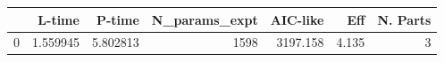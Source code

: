 \begin{tabular}{lrrrrrr}
\toprule
{} &    L-time &    P-time &  N\_params\_expt &  AIC-like &    Eff &  N. Parts \\
\midrule
0 &  1.559945 &  5.802813 &           1598 &  3197.158 &  4.135 &         3 \\
\bottomrule
\end{tabular}
